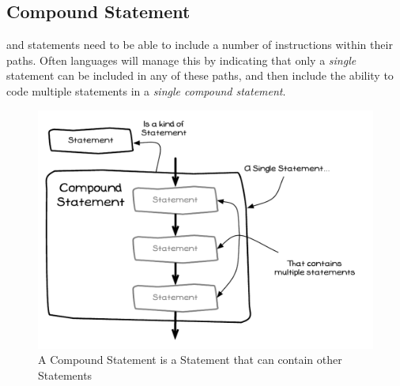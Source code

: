 \clearpage
\subsection{Compound Statement} %
\label{sub:compound_statement}

 and  statements need to be able to include a number of instructions within their paths. Often languages will manage this by indicating that only a \emph{single} statement can be included in any of these paths, and then include the ability to code multiple statements in a \emph{single compound statement}.

\begin{figure}[h]
   \centering
   \includegraphics[width=\textwidth]{./topics/control-flow/diagrams/CompoundStatement} 
   \caption{A Compound Statement is a Statement that can contain other Statements}
   \label{fig:branching-compound-statement}
\end{figure}


